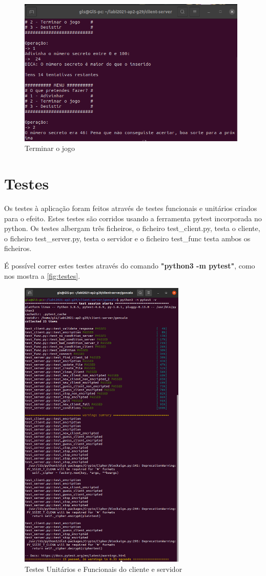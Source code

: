 \documentclass{report}
\begin{document}
\begin{figure}[!h]
\center 
\includegraphics[height=200pt]{img/fotos_resultado/stop_client.png}
\caption{Terminar o jogo}
\label{fig:stop_playing}
\end{figure}

\section{Testes}
\label{sec:testes}

Os testes à aplicação foram feitos através de testes funcionais e unitários criados para o efeito. Estes testes são corridos usando a ferramenta pytest incorporada no python. Os testes albergam três ficheiros, o ficheiro test\_client.py, testa o cliente, o ficheiro test\_server.py, testa o servidor e o ficheiro test\_func testa ambos os ficheiros.

É possível correr estes testes através do comando \textbf{"python3 -m pytest"}, como nos mostra a \autoref{fig:testes}.

\begin{figure}[ht]
\center 
\includegraphics[height=400pt]{img/fotos_resultado/testes.png}
\caption{Testes Unitários e Funcionais do cliente e servidor}
\label{fig:testes}
\end{figure}
\end{document}
